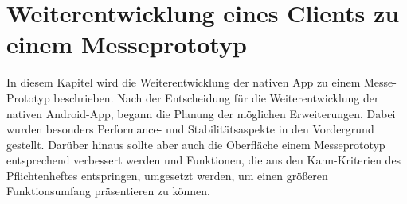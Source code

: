 \chapter{Weiterentwicklung eines Clients zu einem Messeprototyp}
\label{cha:weiterentwicklung-messeprototyp}
In diesem Kapitel wird die Weiterentwicklung der nativen \gls{App} zu einem Messe-Prototyp beschrieben. Nach der Entscheidung für die Weiterentwicklung der nativen Android-App, begann die Planung der möglichen Erweiterungen. Dabei wurden besonders Performance- und Stabilitätsaspekte in den Vordergrund gestellt. Darüber hinaus sollte aber auch die Oberfläche einem Messeprototyp entsprechend verbessert werden und Funktionen, die aus den Kann-Kriterien des Pflichtenheftes entspringen, umgesetzt werden, um einen größeren Funktionsumfang präsentieren zu können.

